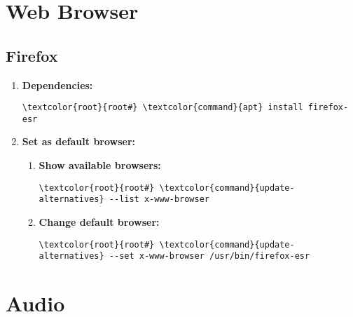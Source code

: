 \documentclass[10pt, a4paper, onecolumn, openany]{book} %
\begin{document}
\chapter{Web Browser}
\section{Firefox}
\begin{enumerate}
    \item \textbf{Dependencies:}
\begin{Verbatim}[commandchars=\\\{\}]
\textcolor{root}{root#} \textcolor{command}{apt} install firefox-esr
\end{Verbatim}
    \item \textbf{Set as default browser:}
    \begin{enumerate}
        \item \textbf{Show available browsers:}
        \begin{Verbatim}[commandchars=\\\{\}]
\textcolor{root}{root#} \textcolor{command}{update-alternatives} --list x-www-browser
\end{Verbatim}
        \item \textbf{Change default browser:}
\begin{Verbatim}[commandchars=\\\{\}]
\textcolor{root}{root#} \textcolor{command}{update-alternatives} --set x-www-browser /usr/bin/firefox-esr
\end{Verbatim}
    \end{enumerate}
\end{enumerate}
\chapter{Audio}
\end{document}
